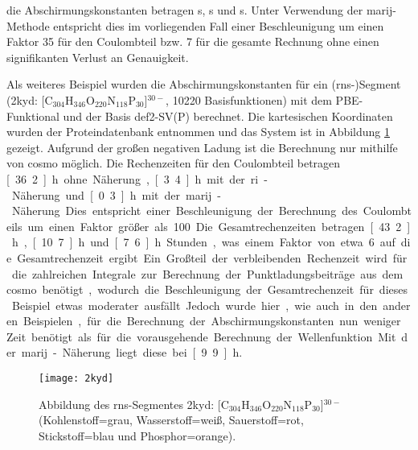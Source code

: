 die Abschirmungskonstanten betragen \unit[4610]{s}, \unit[741]{s} und \unit[633]{s}. Unter Verwendung der \ac{marij}-Methode entspricht dies im vorliegenden Fall einer Beschleunigung um einen Faktor 35 für den Coulombteil bzw. 7 für die gesamte Rechnung ohne einen signifikanten Verlust an Genauigkeit. 

Als weiteres Beispiel wurden die Abschirmungskonstanten für ein \mbox{(\acs{rns}-)}Segment (2kyd\supercite{2kydstructure}: [C$_{304}$H$_{346}$O$_{220}$N$_{118}$P$_{30}$]$^{30-}$, 10220 Basisfunktionen) mit dem PBE-Funktional und der Basis def2-SV(P) berechnet. Die kartesischen Koordinaten wurden der Proteindatenbank entnommen und das System ist in Abbildung \ref{abb:2kyd} gezeigt. Aufgrund der großen negativen Ladung ist die Berechnung nur mithilfe von \ac{cosmo} möglich. Die Rechenzeiten für den Coulombteil betragen \unit[36.2]{h} ohne Näherung, \unit[3.4]{h} mit der \ac{ri}-Näherung und \unit[0.3]{h} mit der \ac{marij}-Näherung. Dies entspricht einer Beschleunigung der Berechnung des Coulombteils um einen Faktor größer als 100. Die Gesamtrechenzeiten betragen \unit[43.2]{h}, \unit[10.7]{h} und \unit[7.6]{h} Stunden, was einem Faktor von etwa 6 auf die Gesamtrechenzeit ergibt. Ein Großteil der verbleibenden Rechenzeit wird für die zahlreichen Integrale zur Berechnung der Punktladungsbeiträge aus dem\ac{cosmo} benötigt, wodurch die Beschleunigung der Gesamtrechenzeit für dieses Beispiel etwas moderater ausfällt. Jedoch wurde hier, wie auch in den anderen Beispielen, für die Berechnung der Abschirmungskonstanten nun weniger Zeit benötigt als für die vorausgehende Berechnung der Wellenfunktion. Mit der \ac{marij}-Näherung liegt diese bei \unit[9.9]{h}.

\begin{figure}[ht!]
	\centering
	\texttt{[image: 2kyd]}
	\captionsetup{figurewithin = chapter}
	\captionsetup{font=small, labelfont=bf}\caption[{Abbildung eines \ac{rns}-Segmentes}]{Abbildung des \ac{rns}-Segmentes 2kyd\supercite{2kydstructure}: [C$_{304}$H$_{346}$O$_{220}$N$_{118}$P$_{30}$]$^{30-}$ (Kohlenstoff=grau, Wasserstoff=weiß, Sauerstoff=rot, Stickstoff=blau und Phosphor=orange).}
\label{abb:2kyd}
\end{figure}
\FloatBarrier


